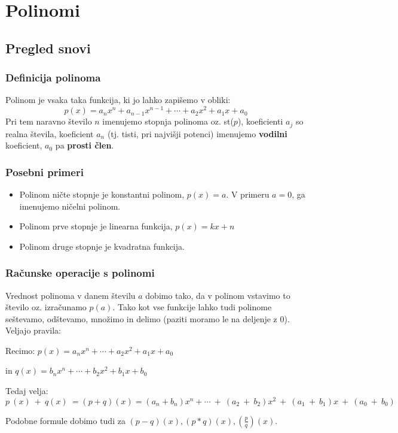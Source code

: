 \chapter{Polinomi}
\label{cha:polinomi}

\section{Pregled snovi}
\label{sec:polinomi-pregled-snovi}


\subsection{Definicija polinoma}
Polinom je vsaka taka funkcija, ki jo lahko zapišemo v obliki:
\[
p(x)=a_nx^n + a_{n-1}x^{n-1}+ \cdots + a_2x^2 + a_1 x + a_0
\]
Pri tem naravno število $n$ imenujemo stopnja polinoma oz. st($p$), koeficienti $ a_j$ so realna števila, koeficient $ a_n$ (tj. tisti, pri najvišji potenci) imenujemo \textbf{vodilni} koeficient, $ a_0$ pa \textbf{prosti člen}.
\subsection{Posebni primeri}
\begin{itemize}
\item Polinom ničte stopnje je konstantni polinom, $p(x)=a$. V primeru $a=0$, ga imenujemo ničelni polinom.
\item Polinom prve stopnje je linearna funkcija, $p(x)=kx + n$
\item Polinom druge stopnje je kvadratna funkcija.
\end{itemize}
\subsection{Računske operacije s polinomi}
Vrednost polinoma v danem številu $a$ dobimo tako, da v polinom vstavimo to število oz. izračunamo $p(a)$. 
Tako kot vse funkcije lahko tudi polinome seštevamo, odštevamo, množimo in delimo (paziti moramo le na deljenje z 0). Veljajo pravila:

Recimo: 
$ p(x)=a_nx^n + \cdots + a_2x^2 + a_1 x + a_0$ 

 in  
$ q(x)=b_nx^n + \cdots + b_2x^2 + b_1 x + b_0$ 

Tedaj velja:
$p~(x)~ +~ q(x)~ = (p+q)(x) =(a_n + b_n)x^n +\cdots ~+~(a_2~ +~ b_2)x^2 ~+~( a_1 ~+ ~b_1) x~ +~ (a_0~+~b_0)$

Podobne formule dobimo tudi za $(p-q)(x), (p*q)(x), (\frac{p}{q})(x)$.
